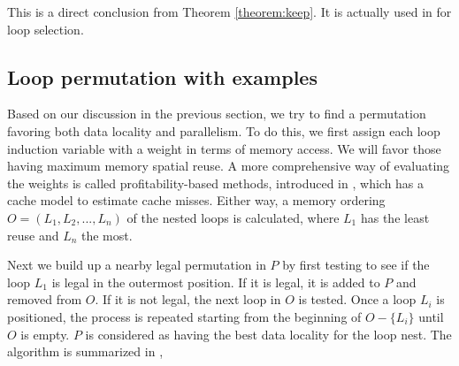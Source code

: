 This is a direct conclusion from Theorem \ref{theorem:keep}. It is
actually used in \cite{All02} for loop selection.

\subsection{Loop permutation with examples}
\label{sec:algorithms}




Based on our discussion in the previous section, we try to find a
permutation favoring both data locality and parallelism. To do this, 
we first assign each loop induction variable with a weight in terms
of memory access. We will favor those having maximum memory spatial
reuse.  A more comprehensive way of evaluating the weights is called
profitability-based methods, introduced in \cite{All02}, which has a
cache model to estimate cache misses. Either way, a memory ordering
$O=(L_1,L_2,...,L_n)$ of the nested loops is calculated, where $L_1$
has the least reuse and $L_n$ the most.

Next we build up a nearby legal permutation in $P$ by first testing to see if the loop $L_1$ is
legal in the outermost position.  If it is legal, it is added to $P$
and removed from $O$. If it is not legal, the next loop in $O$ is
tested.  Once a loop $L_{i}$ is positioned, the process is repeated
starting from the beginning of $O-\{L_{i}\}$ until $O$ is empty. $P$
is considered as having the best data locality for the loop nest. The algorithm is summarized in \cite{Mck96},

